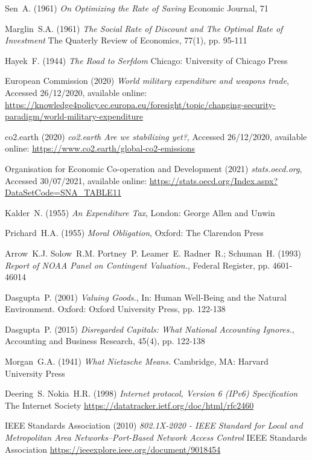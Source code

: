 \documentclass[11pt, oneside]{book}   	%
\begin{document}
\begin{thebibliography}{99}
 Sen~A. (1961)
\emph{On Optimizing the Rate of Saving}
Economic Journal, 71
	
 Marglin~S.A. (1961)
\emph{The Social Rate of Discount and The Optimal Rate of Investment}
The Quaterly Review of Economics, 77(1), pp. 95-111
	
 Hayek~F. (1944)
\emph{The Road to Serfdom}
Chicago: University of Chicago Press
	
 European Commission (2020)
\emph{World military expenditure and weapons trade},
Accessed 26/12/2020, available online: 
\url{https://knowledge4policy.ec.europa.eu/foresight/topic/changing-security-paradigm/world-military-expenditure}
	
 co2.earth (2020)
\emph{co2.earth Are we stabilizing yet?},
Accessed 26/12/2020, available online: 
\url{https://www.co2.earth/global-co2-emissions}
	
 Organisation for Economic Co-operation and Development (2021)
\emph{stats.oecd.org},
Accessed 30/07/2021, available online: 
\url{https://stats.oecd.org/Index.aspx?DataSetCode=SNA_TABLE11}
	
 Kalder~N. (1955)
\emph{An Expenditure Tax},
London: George Allen and Unwin
	
 Prichard~H.A. (1955)
\emph{Moral Obligation},
Oxford: The Clarendon Press

 Arrow~K.J. Solow~R.M. Portney~P. Leamer~E. Radner~R.; Schuman~H. (1993)
\emph{Report of NOAA Panel on Contingent Valuation.},
Federal Register, pp. 4601-46014
	
 Dasgupta~P. (2001)
\emph{Valuing Goods.},
In: Human Well-Being and the Natural Environment. Oxford: Oxford University Press, pp. 122-138
	
 Dasgupta~P. (2015)
\emph{Disregarded Capitals: What National Accounting Ignores.},
Accounting and Business Research, 45(4), pp. 122-138
	
 Morgan~G.A. (1941)
\emph{What Nietzsche Means.}
Cambridge, MA: Harvard University Press

 Deering~S. Nokia~H.R. (1998)
\emph{Internet protocol, Version 6 (IPv6) Specification}
The Internet Society
\url{https://datatracker.ietf.org/doc/html/rfc2460}

 IEEE Standards Association (2010)
\emph{802.1X-2020 - IEEE Standard for Local and Metropolitan Area Networks--Port-Based Network Access Control}
IEEE Standards Association
\url{https://ieeexplore.ieee.org/document/9018454}


\end{thebibliography}
\end{document}
